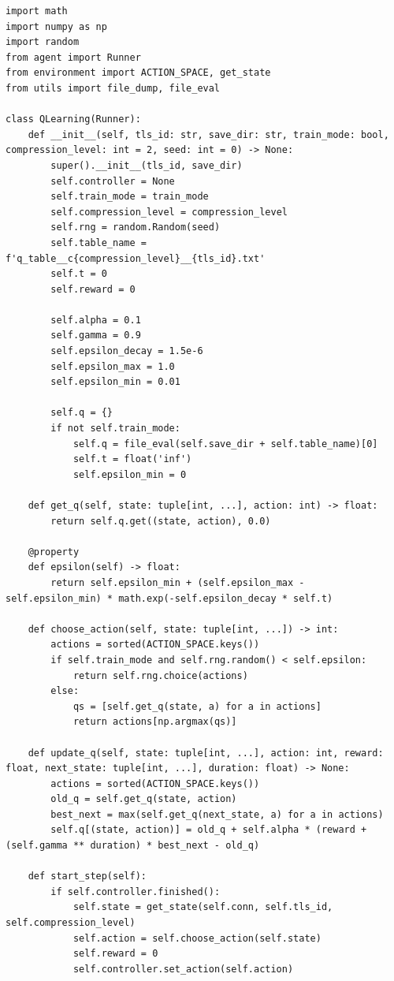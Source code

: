 \documentclass[a4paper]{report}
\begin{document}
\begin{lstlisting}[style=pythonstyle]
import math
import numpy as np
import random
from agent import Runner
from environment import ACTION_SPACE, get_state
from utils import file_dump, file_eval

class QLearning(Runner):
    def __init__(self, tls_id: str, save_dir: str, train_mode: bool, compression_level: int = 2, seed: int = 0) -> None:
        super().__init__(tls_id, save_dir)
        self.controller = None
        self.train_mode = train_mode
        self.compression_level = compression_level
        self.rng = random.Random(seed)
        self.table_name = f'q_table__c{compression_level}__{tls_id}.txt'
        self.t = 0
        self.reward = 0

        self.alpha = 0.1
        self.gamma = 0.9
        self.epsilon_decay = 1.5e-6
        self.epsilon_max = 1.0
        self.epsilon_min = 0.01

        self.q = {}
        if not self.train_mode:
            self.q = file_eval(self.save_dir + self.table_name)[0]
            self.t = float('inf')
            self.epsilon_min = 0

    def get_q(self, state: tuple[int, ...], action: int) -> float:
        return self.q.get((state, action), 0.0)

    @property
    def epsilon(self) -> float:
        return self.epsilon_min + (self.epsilon_max - self.epsilon_min) * math.exp(-self.epsilon_decay * self.t)

    def choose_action(self, state: tuple[int, ...]) -> int:
        actions = sorted(ACTION_SPACE.keys())
        if self.train_mode and self.rng.random() < self.epsilon:
            return self.rng.choice(actions)
        else:
            qs = [self.get_q(state, a) for a in actions]
            return actions[np.argmax(qs)]

    def update_q(self, state: tuple[int, ...], action: int, reward: float, next_state: tuple[int, ...], duration: float) -> None:
        actions = sorted(ACTION_SPACE.keys())
        old_q = self.get_q(state, action)
        best_next = max(self.get_q(next_state, a) for a in actions)
        self.q[(state, action)] = old_q + self.alpha * (reward + (self.gamma ** duration) * best_next - old_q)

    def start_step(self):
        if self.controller.finished():
            self.state = get_state(self.conn, self.tls_id, self.compression_level)
            self.action = self.choose_action(self.state)
            self.reward = 0
            self.controller.set_action(self.action)


\end{lstlisting}
\end{document}
